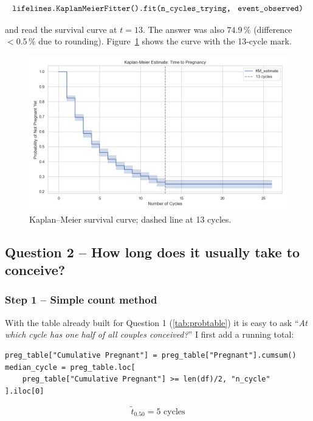 \documentclass[11pt,a4paper]{article}
\begin{document}
\[
\texttt{lifelines.KaplanMeierFitter().fit(n\_cycles\_trying,\; event\_observed)}
\]

and read the survival curve at \(t=13\).  
The answer was also \(74.9\,\%\) (difference $<0.5\,\%$ due to rounding).  
Figure~\ref{fig:km13} shows the curve with the 13-cycle mark.

\begin{figure}[htbp!]
  \centering
  \includegraphics[width=0.8\linewidth]{../results/Kaplan_meier_13.png}
  \caption{Kaplan–Meier survival curve; dashed line at 13 cycles.}
  \label{fig:km13}
\end{figure}
\FloatBarrier


\subsection{Question 2 – How long does it usually take to conceive?}

\subsubsection{Step 1 – Simple count method}
With the table already built for Question 1 (\ref{tab:probtable}) it is easy to ask  
“\emph{At which cycle has one half of all couples conceived?}”
I first add a running total:

\begin{center}
\begin{minipage}{0.9\linewidth}
\begin{verbatim}
preg_table["Cumulative Pregnant"] = preg_table["Pregnant"].cumsum()
median_cycle = preg_table.loc[
    preg_table["Cumulative Pregnant"] >= len(df)/2, "n_cycle"
].iloc[0]
\end{verbatim}
\end{minipage}
\end{center}

\[
\boxed{\tilde{t}_{0.50} = 5\text{ cycles}}
\]
\end{document}

